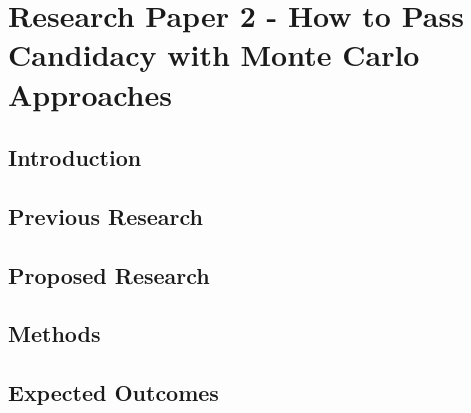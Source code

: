 %
%
% 
%


\chapter{Research Paper 2 - How to Pass Candidacy with Monte Carlo Approaches}
\clearpage

\section{Introduction}

\section{Previous Research}

\section{Proposed Research}

\section{Methods}

\section{Expected Outcomes} 


